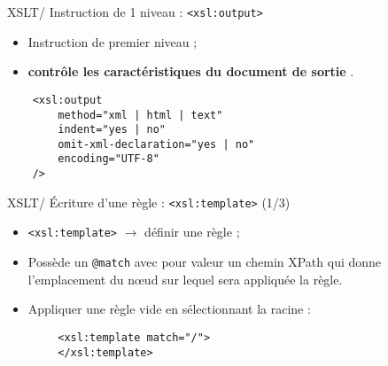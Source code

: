 \documentclass{beamer}
\begin{document}
        \begin{frame}[fragile]{XSLT/ Instruction de 1 niveau : \texttt{<xsl:output>}}
        \Large
            \begin{itemize}
                \item Instruction de premier niveau ;
                \item \og \textbf{contrôle les caractéristiques du document de sortie} \fg.
            \end{itemize}

            \begin{verbatim}
    <xsl:output
        method="xml | html | text"
        indent="yes | no"
        omit-xml-declaration="yes | no"
        encoding="UTF-8"
    />
            \end{verbatim}
        \end{frame}

        \begin{frame}[fragile]{XSLT/ Écriture d'une règle : \texttt{<xsl:template>} (1/3)}
            \Large
            \begin{itemize}
                \item \texttt{<xsl:template>} $\rightarrow$ définir une règle ;
                \bigskip
                \item Possède un \texttt{@match} avec pour valeur un chemin XPath qui donne l'emplacement du n\oe ud sur lequel sera appliquée la règle.
                \bigskip
                \item Appliquer une règle vide en sélectionnant la racine :
            \end{itemize}

            \begin{verbatim}
        <xsl:template match="/">
        </xsl:template>
            \end{verbatim}
        \end{frame}
\end{document}
